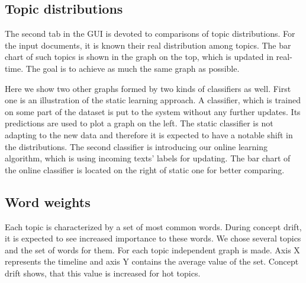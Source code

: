 \subsection{Topic distributions}

The second tab in the GUI is devoted to comparisons of topic distributions. For the input documents, it is known their real distribution among topics. The bar chart of such topics is shown in the graph on the top, which is updated in real-time. The goal is to achieve as much the same graph as possible. 

Here we show two other graphs formed by two kinds of classifiers as well. First one is an illustration of the static learning approach. A classifier, which is trained on some part of the dataset is put to the system without any further updates. Its predictions are used to plot a graph on the left. The static classifier is not adapting to the new data and therefore it is expected to have a notable shift in the distributions. The second classifier is introducing our online learning algorithm, which is using incoming texts' labels for updating. The bar chart of the online classifier is located on the right of static one for better comparing.

\subsection{Word weights}

Each topic is characterized by a set of most common words. During concept drift, it is expected to see increased importance to these words. We chose several topics and the set of words for them. For each topic independent graph is made. Axis X represents the timeline and axis Y contains the average value of the set. Concept drift shows, that this value is increased for hot topics.

